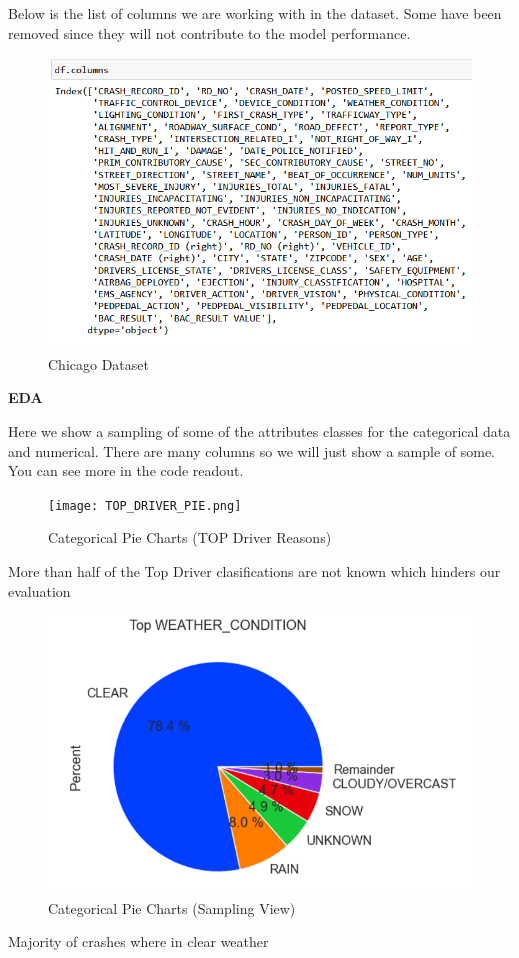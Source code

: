 \documentclass[conference]{IEEEtran}
\begin{document}
Below is the list of columns we are working with in the dataset.  Some have been removed since they will not contribute to the model performance.
\begin{figure}[!h]
	\includegraphics[width=\linewidth]{Chicago_Column.png}
	\caption{Chicago Dataset}
	\label{fig: Chicago Dataset for Crashes and People involved}
 \end{figure}
 \begin{center} 
	\textbf{EDA} 
	\end{center}
Here we show a sampling of some of the attributes classes for the categorical data and numerical.  There are many columns so we will just show a sample of some. You can see more in the code readout. 
\begin{figure}[!h]
	\texttt{[image: TOP\_DRIVER\_PIE.png]}
	\caption{Categorical Pie Charts (TOP Driver Reasons)}
	\label{fig: Top Driver Condition Pie chart}
 \end{figure}
More than half of the Top Driver clasifications are not known which hinders our evaluation

\begin{figure}[!h]
	\includegraphics[width=\linewidth]{TOP_WEATHER_CONDITION_PIE.png}
	\caption{Categorical Pie Charts (Sampling View)}
	\label{fig: Top_Weather_Condition Pie chart}
 \end{figure}
Majority of crashes where in clear weather
 
\end{document}
